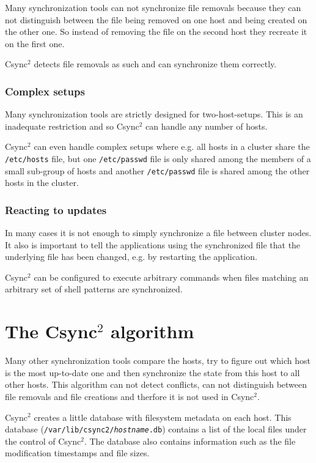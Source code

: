 \documentclass[a4paper,twocolumn]{article}
\def\csync2{{\sc Csync$^{2}$}}
\begin{document}
Many synchronization tools can not synchronize file removals because they can
not distinguish between the file being removed on one host and being created on
the other one. So instead of removing the file on the second host they recreate
it on the first one.

\csync2 detects file removals as such and can synchronize them correctly.

\subsubsection{Complex setups}

Many synchronization tools are strictly designed for two-host-setups. This is
an inadequate restriction and so \csync2 can handle any number of hosts.

\csync2 can even handle complex setups where e.g. all hosts in a cluster share
the {\tt /etc/hosts} file, but one {\tt /etc/passwd} file is only shared among
the members of a small sub-group of hosts and another {\tt /etc/passwd} file is
shared among the other hosts in the cluster.

\subsubsection{Reacting to updates}

In many cases it is not enough to simply synchronize a file between cluster
nodes. It also is important to tell the applications using the synchronized
file that the underlying file has been changed, e.g. by restarting the
application.

\csync2 can be configured to execute arbitrary commands when files matching an
arbitrary set of shell patterns are synchronized.

\section{The \csync2 algorithm}

Many other synchronization tools compare the hosts, try to figure out which
host is the most up-to-date one and then synchronize the state from this host
to all other hosts. This algorithm can not detect conflicts, can not
distinguish between file removals and file creations and therfore it is not
used in \csync2.

\csync2 creates a little database with filesystem metadata on each host. This
database ({\tt /var/lib/csync2/{\it hostname}.db}) contains a list of the local
files under the control of \csync2. The database also contains information such
as the file modification timestamps and file sizes.
\end{document}
